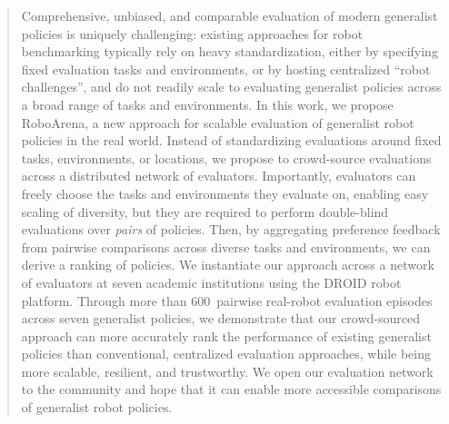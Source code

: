 
\begin{abstract}

Comprehensive, unbiased, and comparable evaluation of modern generalist policies is uniquely challenging: existing approaches for robot benchmarking typically rely on heavy standardization, either by specifying fixed evaluation tasks and environments, or by hosting centralized ``robot challenges'', and do not readily scale to evaluating generalist policies across a broad range of tasks and environments. In this work, we propose RoboArena, a new approach for scalable evaluation of generalist robot policies in the real world. Instead of standardizing evaluations around fixed tasks, environments, or locations, we propose to crowd-source evaluations across a distributed network of evaluators. Importantly, evaluators can freely choose the tasks and environments they evaluate on, enabling easy scaling of diversity, but they are required to perform double-blind evaluations over \emph{pairs} of policies. Then, by aggregating preference feedback from pairwise comparisons across diverse tasks and environments, we can derive a ranking of policies. We instantiate our approach across a network of evaluators at seven academic institutions using the DROID robot platform. Through more than 600~pairwise real-robot evaluation episodes across seven generalist policies, we demonstrate that our crowd-sourced approach can more accurately rank the performance of existing generalist policies than conventional, centralized evaluation approaches, while being more scalable, resilient, and trustworthy. We open our evaluation network to the community and hope that it can enable more accessible comparisons of generalist robot policies.












\end{abstract}



